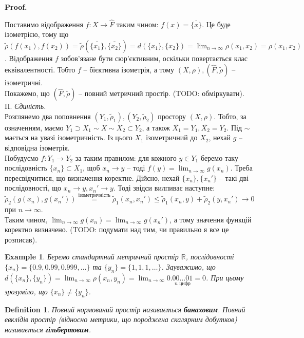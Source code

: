 \documentclass[a4paper, 10pt]{article}
\makeatletter
\theoremstyle{theoremdd}
\theoremstyle{theoremdd}
\newtheorem{definition}[theorem]{Definition}
\theoremstyle{theoremdd}
\theoremstyle{theoremdd}
\newtheorem{example}[theorem]{Example}
\theoremstyle{theoremdd}
\theoremstyle{theoremdd}
\theoremstyle{theoremdd}
\theoremstyle{theoremdd}
\renewenvironment{proof}[1][Proof.\\]{\par
\pushQED{\hfill \qed}%
\normalfont \topsep6\p@\@plus6\p@\relax
\trivlist
\item\relax
{\bfseries
#1\@addpunct{.}}\hspace\labelsep\ignorespaces
}{%
\popQED\endtrivlist\@endpefalse
}
\makeatother
\begin{document}
\begin{proof}
Поставимо відображення $f \colon X \to \hat{F}$ таким чином: $f(x) = \overline{\{x\}}$. Це буде ізометрією, тому що\\
$\tilde{\rho}(f(x_1),f(x_2)) = \tilde{\rho}( \overline{\{x_1\}},\overline{\{x_2\}} ) = d( \{x_1\}, \{x_2\} ) = \displaystyle \lim_{n \to \infty} \rho(x_1,x_2) = \rho(x_1,x_2)$. Відображення $f$ зобов'язане бути сюр'єктивним, оскільки повертається клас еквівалентності. Тобто $f$ -- бієктивна ізометрія, а тому $(X,\rho), (\hat{F},\tilde{\rho})$ -- ізометричні.\\
Покажемо, що $(\hat{F},\tilde{\rho})$ -- повний метричний простір. (TODO: обміркувати).
\bigskip \\
II. \textit{Єдиність.}\\
Розглянемо два поповнення $(Y_1,\tilde{\rho}_1), (Y_2,\tilde{\rho}_2)$ простору $(X,\rho)$. Тобто, за означенням, маємо $Y_1 \supset X_1 \sim X \sim X_2 \subset Y_2$, а також $\overline{X_1} = Y_1, \overline{X_2} = Y_2$. Під $\sim$ мається на увазі ізометричність. Із цього $X_1$ ізометричний до $X_2$, нехай $g$ -- відповідна ізометрія.\\
Побудуємо $f \colon Y_1 \to Y_2$ за таким правилом: для кожного $y \in Y_1$ беремо таку послідовність $\{x_n\} \subset X_1$, щоб $x_n \to y$ -- тоді $f(y) = \displaystyle\lim_{n \to \infty} g(x_n)$. Треба пересвідчитися, що визначення коректне. Дійсно, нехай $\{x_n\}, \{x_n'\}$ -- такі дві послідовності, що $x_n \to y, x_n' \to y$. Тоді звідси вилпиває наступне:\\
$\tilde{\rho}_2 (g(x_n),g(x_n')) \overset{\text{ізометричність}}{=} \tilde{\rho}_1(x_n,x_n') \leq \tilde{\rho}_1(x_n,y) + \tilde{\rho}_2(y,x_n') \to 0$ при $n \to \infty$.\\
Таким чином, $\displaystyle\lim_{n \to \infty} g(x_n) = \lim_{n \to \infty} g(x_n')$, а тому значення функцій коректно визначено. (TODO: подумати над тим, чи правильно я все це розписав).
\end{proof}

\begin{example}
Беремо стандартний метричний простір $\mathbb{R}$, послідовності $\{x_n\} = \{0.9, 0.99, 0.999, \dots\}$ та $\{y_n\} = \{1,1,1,\dots\}$. Зауважимо, що $d(\{x_n\},\{y_n\}) = \displaystyle\lim_{n \to \infty} \rho(x_n,y_n) = \lim_{n \to \infty} 0.\underset{n \text{ цифр}}{00\dots 01} = 0$. При цьому зрозуміло, що $\{x_n\} \neq \{y_n\}$.
\end{example}

\begin{definition}
Повний нормований простір називається \textbf{банаховим}. Повний евклідів простір (відносно метрики, що породжена скалярним добутков) називається \textbf{гільбертовим}.
\end{definition}
\end{document}
